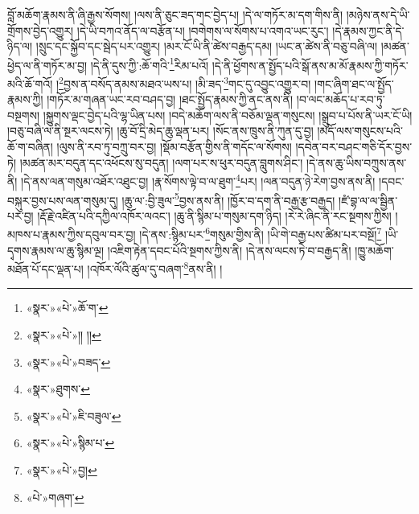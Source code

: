 བློ་མཆོག་རྣམས་ནི་ཞི་རྒྱས་སོགས། །ལས་ནི་ཅུང་ཟད་གང་བྱེད་པ། །དེ་ལ་གཏོར་མ་དག་གིས་ནི། །མཉེས་ནས་དེ་ཡི་གྲོགས་བྱེད་འགྱུར། །དེ་ཡི་བཀའ་ནོད་ལ་བརྩོན་པ། །བགེགས་ལ་སོགས་པ་འགའ་ཡང་རུང་། །དེ་རྣམས་ཀྱང་ནི་དེ་ཉིད་ལ། །སྲུང་དང་སྐྱོབ་དང་སྦེད་པར་འགྱུར། །མར་ངོ་ཡི་ནི་ཚེས་བརྒྱད་དམ། །ཡང་ན་ཚེས་ནི་བཅུ་བཞི་ལ། །མཚན་ཕྱེད་ལ་ནི་གཏོར་མ་བྱ། །དེ་ནི་དུས་ཀྱི་:ཆོ་གའི་\footnote{«སྣར་»«པེ་»ཆོ་ག་}རིམ་པའོ། །དེ་ནི་ཕྱོགས་ན་སྤྱོད་པའི་སྒོ་ནས་མ་མོ་རྣམས་ཀྱི་གཏོར་མའི་ཆོ་གའོ། །\footnote{«སྣར་»«པེ་»།། །།}བྱས་ན་བསོད་ནམས་མཐའ་ཡས་པ། །མི་ཟད་\footnote{«སྣར་»«པེ་»བཟད་}གང་དུ་འབྱུང་འགྱུར་བ། །གང་ཞིག་ཐང་ལ་སྤྱོད་རྣམས་ཀྱི། །གཏོར་མ་གཞན་ཡང་རབ་བཤད་བྱ། །ཐང་སྤྱོད་རྣམས་ཀྱི་ནང་ནས་ནི། །བ་ལང་མཆོད་པ་རབ་ཏུ་བསྔགས། །སྐྱུགས་ལྡང་བྱེད་པའི་ལྷ་ཡིན་པས། །བདེ་མཆོག་ལས་ནི་བཅོམ་ལྡན་གསུངས། །སྒྲུབ་པ་པོས་ནི་ཡར་ངོ་ཡི། །བཅུ་བཞི་ལ་ནི་སྔར་ལངས་ཏེ། །ཆུ་བོ་དྲི་མེད་ཆུ་ལྡན་པར། །སོང་ནས་ཁྲུས་ནི་ཀུན་དུ་བྱ། །མདོ་ལས་གསུངས་པའི་ཆོ་ག་བཞིན། །ལུས་ནི་རབ་ཏུ་བཀྲུ་བར་བྱ། །སྡོམ་བརྩོན་གྱིས་ནི་གདོང་ལ་སོགས། །དབེན་བར་བཤང་གཅི་དོར་བྱས་ཏེ། །མཚན་མར་བདུན་དང་འཕོངས་སུ་བདུན། །ལག་པར་ས་ཕུར་བདུན་བླུགས་ཤིང་། །དེ་ནས་ཆུ་ཡིས་བཀྲུས་ནས་ནི། །དེ་ནས་ལན་གསུམ་འཐོར་འཐུང་བྱ། །རྣ་སོགས་ལྟེ་བ་ལ་ཐུག་\footnote{«སྣར་»ཐུགས་}པར། །ལན་བདུན་ཉེ་རེག་བྱས་ནས་ནི། །དབང་བསྐུར་བྱས་པས་ལན་གསུམ་དུ། །ཆུ་ལ་:བྱི་ཟུལ་\footnote{«སྣར་»«པེ་»ཇི་བཟུལ་}བྱས་ནས་ནི། །ཁྱོར་བ་དག་ནི་བརྒྱ་རྩ་བརྒྱད། །ཛཾ་བྷ་ལ་ལ་སྦྱིན་པར་བྱ། །རྡོ་རྗེ་འཛིན་པའི་དཀྱིལ་འཁོར་ལའང་། །ཆུ་ནི་སྙིམ་པ་གསུམ་དག་ཉིད། །རེ་རེ་ཞིང་ནི་རང་སྔགས་ཀྱིས། །མཁས་པ་རྣམས་ཀྱིས་དབུལ་བར་བྱ། །དེ་ནས་:སྙིམ་པར་\footnote{«སྣར་»«པེ་»སྙིམ་པ་}གསུམ་གྱིས་ནི། །ཡི་གེ་བརྒྱ་པས་ཚིམ་པར་བསྔོ།\footnote{«སྣར་»«པེ་»བྱ།} །ཡི་དྭགས་རྣམས་ལ་ཆུ་སྙིམ་ལྔ། །འཇིག་རྟེན་དབང་པོའི་སྔགས་ཀྱིས་ནི། །དེ་ནས་ལངས་ཏེ་བ་བརྒྱད་ནི། །ཁྱུ་མཆོག་མཐོན་པོ་དང་ལྡན་པ། །འཁོར་ལོའི་ཚུལ་དུ་བཞག་\footnote{«པེ་»གཞག་}ནས་ནི། །
